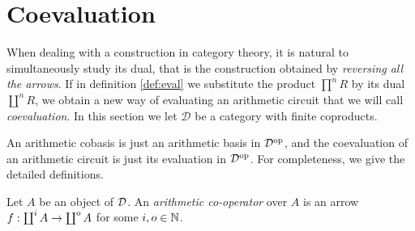 \section{Coevaluation}
When dealing with a construction in category theory, it is natural to
simultaneously study its dual, that is the construction obtained by
\emph{reversing all the arrows}. If in definition \ref{def:eval} we
substitute the product $\prod^nR$ by its dual $\coprod^nR$, we obtain
a new way of evaluating an arithmetic circuit that we will call
\emph{coevaluation}. In this section we let $\mathcal{D}$ be a
category with finite coproducts.

An arithmetic cobasis is just an arithmetic basis in $\mathcal{D}^{\mathrm{op}}$, and the
coevaluation of an arithmetic circuit is just its evaluation in
$\mathcal{D}^{\mathrm{op}}$. For completeness, we give the detailed definitions.

\begin{definition}
  Let $A$ be an object of $\mathcal{D}$.  An \emph{arithmetic co-operator} over
  $A$ is an arrow $f:\coprod^iA\rightarrow\coprod^oA$ for some $i,o\in\mathbb{N}$.
\end{definition}

